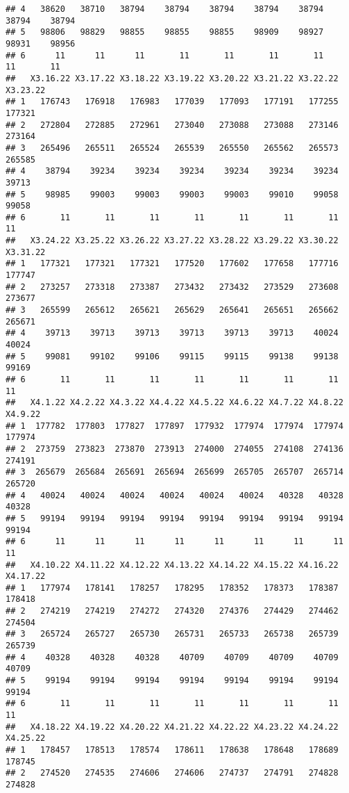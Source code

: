 \documentclass[
]{article}
\begin{document}
\begin{verbatim}
## 4   38620   38710   38794    38794    38794    38794    38794    38794    38794
## 5   98806   98829   98855    98855    98855    98909    98927    98931    98956
## 6      11      11      11       11       11       11       11       11       11
##   X3.16.22 X3.17.22 X3.18.22 X3.19.22 X3.20.22 X3.21.22 X3.22.22 X3.23.22
## 1   176743   176918   176983   177039   177093   177191   177255   177321
## 2   272804   272885   272961   273040   273088   273088   273146   273164
## 3   265496   265511   265524   265539   265550   265562   265573   265585
## 4    38794    39234    39234    39234    39234    39234    39234    39713
## 5    98985    99003    99003    99003    99003    99010    99058    99058
## 6       11       11       11       11       11       11       11       11
##   X3.24.22 X3.25.22 X3.26.22 X3.27.22 X3.28.22 X3.29.22 X3.30.22 X3.31.22
## 1   177321   177321   177321   177520   177602   177658   177716   177747
## 2   273257   273318   273387   273432   273432   273529   273608   273677
## 3   265599   265612   265621   265629   265641   265651   265662   265671
## 4    39713    39713    39713    39713    39713    39713    40024    40024
## 5    99081    99102    99106    99115    99115    99138    99138    99169
## 6       11       11       11       11       11       11       11       11
##   X4.1.22 X4.2.22 X4.3.22 X4.4.22 X4.5.22 X4.6.22 X4.7.22 X4.8.22 X4.9.22
## 1  177782  177803  177827  177897  177932  177974  177974  177974  177974
## 2  273759  273823  273870  273913  274000  274055  274108  274136  274191
## 3  265679  265684  265691  265694  265699  265705  265707  265714  265720
## 4   40024   40024   40024   40024   40024   40024   40328   40328   40328
## 5   99194   99194   99194   99194   99194   99194   99194   99194   99194
## 6      11      11      11      11      11      11      11      11      11
##   X4.10.22 X4.11.22 X4.12.22 X4.13.22 X4.14.22 X4.15.22 X4.16.22 X4.17.22
## 1   177974   178141   178257   178295   178352   178373   178387   178418
## 2   274219   274219   274272   274320   274376   274429   274462   274504
## 3   265724   265727   265730   265731   265733   265738   265739   265739
## 4    40328    40328    40328    40709    40709    40709    40709    40709
## 5    99194    99194    99194    99194    99194    99194    99194    99194
## 6       11       11       11       11       11       11       11       11
##   X4.18.22 X4.19.22 X4.20.22 X4.21.22 X4.22.22 X4.23.22 X4.24.22 X4.25.22
## 1   178457   178513   178574   178611   178638   178648   178689   178745
## 2   274520   274535   274606   274606   274737   274791   274828   274828

\end{verbatim}
\end{document}
